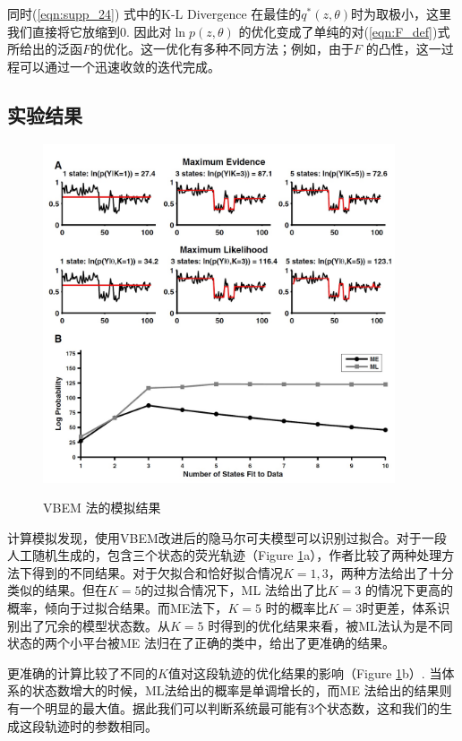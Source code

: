 \documentclass[11pt, a4paper]{article}
\begin{document}
    同时(\ref{eqn:supp_24}) 式中的K-L Divergence 在最佳的$q^*(z,\theta)$时为取极小，这里我们直接将它放缩到0. 因此对$\ln p(z,\theta)$ 的优化变成了单纯的对(\ref{eqn:F_def})式所给出的泛函$F$的优化。这一优化有多种不同方法；例如，由于$F$ 的凸性，这一过程可以通过一个迅速收敛的迭代完成。

    \subsection{实验结果}
    \begin{figure}[htb]
      \centering
      \includegraphics[height=10cm]{fig_vbms.jpg}\\
      \caption{VBEM 法的模拟结果}
      \label{fig:vbem}
    \end{figure}

    计算模拟发现，使用VBEM改进后的隐马尔可夫模型可以识别过拟合。对于一段人工随机生成的，包含三个状态的荧光轨迹（Figure \ref{fig:vbem}a），作者比较了两种处理方法下得到的不同结果。对于欠拟合和恰好拟合情况$K=1, 3$，两种方法给出了十分类似的结果。但在$K=5$的过拟合情况下，ML 法给出了比$K=3$ 的情况下更高的概率，倾向于过拟合结果。而ME法下，$K=5$ 时的概率比$K=3$时更差，体系识别出了冗余的模型状态数。从$K=5$ 时得到的优化结果来看，被ML法认为是不同状态的两个小平台被ME 法归在了正确的类中，给出了更准确的结果。

    更准确的计算比较了不同的$K$值对这段轨迹的优化结果的影响（Figure \ref{fig:vbem}b）. 当体系的状态数增大的时候，ML法给出的概率是单调增长的，而ME 法给出的结果则有一个明显的最大值。据此我们可以判断系统最可能有3个状态数，这和我们的生成这段轨迹时的参数相同。
\end{document}
